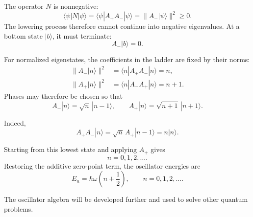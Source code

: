 The operator \(N\) is nonnegative:
\begin{equation}
\langle\psi|N|\psi\rangle
=\langle\psi|A_+A_-|\psi\rangle
=\|A_-|\psi\rangle\|^2
\geq0.
\end{equation}
The lowering process therefore cannot continue into negative eigenvalues. At a bottom state \(|b\rangle\), it must terminate:
\begin{equation}
A_-|b\rangle=0.
\end{equation}

For normalized eigenstates, the coefficients in the ladder are fixed by their norms:
\begin{align}
\|A_-|n\rangle\|^2
&=\langle n|A_+A_-|n\rangle=n, \\
\|A_+|n\rangle\|^2
&=\langle n|A_-A_+|n\rangle=n+1.
\end{align}
Phases may therefore be chosen so that
\begin{equation}
A_-|n\rangle=\sqrt{n}\,|n-1\rangle,
\qquad
A_+|n\rangle=\sqrt{n+1}\,|n+1\rangle.
\end{equation}

\begin{classroomqa}
\end{classroomqa}

Indeed,
\begin{equation}
A_+A_-|n\rangle
=\sqrt n\,A_+|n-1\rangle
=n|n\rangle.
\end{equation}

\begin{classroomqa}
\end{classroomqa}


Starting from this lowest state and applying \(A_+\) gives
\begin{equation}
n=0,1,2,\ldots.
\end{equation}
Restoring the additive zero-point term, the oscillator energies are
\begin{equation}
E_n=\hbar\omega\left(n+\frac{1}{2}\right),
\qquad n=0,1,2,\ldots.
\end{equation}

The oscillator algebra will be developed further and used to solve other quantum problems.
